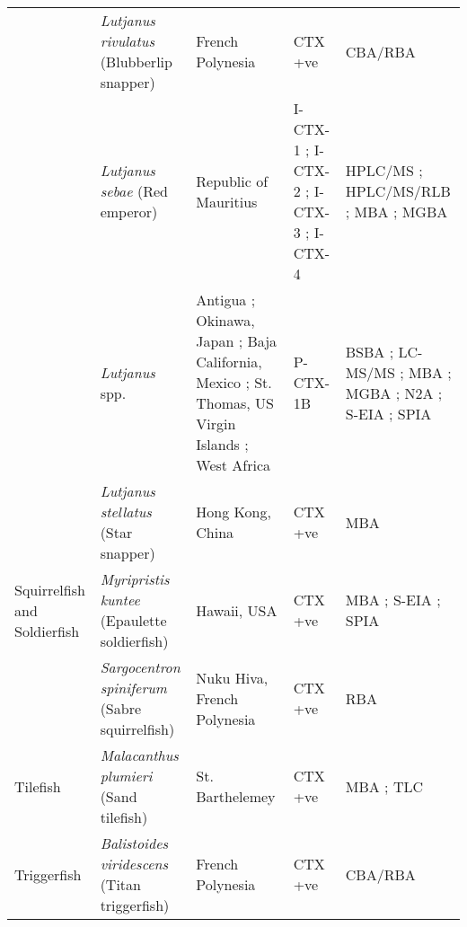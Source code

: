 \documentclass[12pt]{article}
\begin{document}
\begin{longtable}{  | p{2cm} | p{3cm} | p{4.5cm}  | p{2cm} | p{3cm}  | }
  & \emph{Lutjanus rivulatus} (Blubberlip snapper) & French Polynesia \cite{chinain2014mail} & CTX +ve \cite{chinain2014mail} & CBA/RBA \cite{chinain2014mail} \\
  &  \emph{Lutjanus sebae} (Red emperor) & Republic of Mauritius \cite{hamilton2002multiple,hamilton2002isolation} & I-CTX-1 \cite{hamilton2002multiple,hamilton2002isolation}; I-CTX-2 \cite{hamilton2002multiple,hamilton2002isolation}; I-CTX-3 \cite{hamilton2002multiple,hamilton2002isolation}; I-CTX-4 \cite{hamilton2002multiple,hamilton2002isolation} & HPLC/MS \cite{hamilton2002multiple,hamilton2002isolation}; HPLC/MS/RLB \cite{hamilton2002multiple,hamilton2002isolation}; MBA \cite{hamilton2002multiple,hamilton2002isolation}; MGBA \cite{hamilton2002multiple,hamilton2002isolation} \\ %
  & \emph{Lutjanus} spp. & Antigua \cite{hokama1990simplified}; Okinawa, Japan \cite{yogi2011detailed}; Baja California, Mexico \cite{parrilla1992outbreaks}; St. Thomas, US Virgin Islands \cite{granade1976ciguatera}; West Africa \cite{bienfang2008ciguatera} & P-CTX-1B \cite{yogi2011detailed} & BSBA \cite{granade1976ciguatera}; LC-MS/MS \cite{yogi2011detailed}; MBA \cite{parrilla1992outbreaks}; MGBA \cite{granade1976ciguatera}; N2A \cite{bienfang2008ciguatera}; S-EIA \cite{hokama1990simplified}; SPIA \cite{hokama1990simplified} \\
  & \emph{Lutjanus stellatus} (Star snapper) & Hong Kong, China \cite{wong2008features} & CTX +ve \cite{wong2008features} & MBA \cite{wong2008features} \\
  \hline	
 Squirrelfish and Soldierfish &  \emph{Myripristis kuntee} (Epaulette soldierfish) & Hawaii, USA \cite{hokama1993evaluation} & CTX +ve \cite{hokama1993evaluation}  & MBA \cite{hokama1993evaluation}; S-EIA \cite{hokama1993evaluation}; SPIA \cite{hokama1993evaluation}\\
  & \emph{Sargocentron spiniferum} (Sabre squirrelfish)  &  Nuku Hiva, French Polynesia \cite{darius2007ciguatera} & CTX +ve \cite{darius2007ciguatera}  & RBA \cite{darius2007ciguatera} \\
  \hline
 Tilefish & \emph{Malacanthus plumieri} (Sand tilefish) & St. Barthelemey \cite{vernoux1986heterogeneity} & CTX +ve \cite{vernoux1986heterogeneity}  & MBA \cite{vernoux1986heterogeneity}; TLC \cite{vernoux1986heterogeneity} \\
\hline
Triggerfish   & \emph{Balistoides viridescens} (Titan triggerfish) & French Polynesia \cite{chinain2014mail} & CTX +ve \cite{chinain2014mail} & CBA/RBA \cite{chinain2014mail} \\

\end{longtable}
\end{document}

